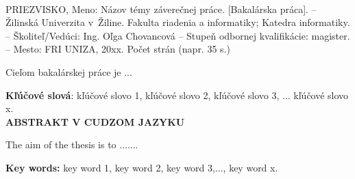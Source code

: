 
\\

\noindent
PRIEZVISKO, Meno: Názov témy záverečnej práce. [Bakalárska práca]. – Žilinská Univerzita v~Žiline. Fakulta riadenia a informatiky; Katedra informatiky. – Školiteľ/Vedúci: Ing. Oľga Chovancová –   Stupeň odbornej kvalifikácie: magister. – Mesto: FRI UNIZA, 20xx. Počet strán (napr. 35 s.)

\bigskip
Cieľom bakalárskej práce je ...


\bigskip
\noindent
\textbf{Kľúčové slová}:  kľúčové slovo 1, kľúčové slovo 2, kľúčové slovo 3, ... kľúčové slovo x.
\bigskip
\\

\bigskip
\noindent\textbf{ABSTRAKT V CUDZOM JAZYKU }

\bigskip
The aim of the thesis is to .......

\bigskip
\noindent
\textbf{Key words: } key word 1, key word 2, key word 3,..., key word x. 